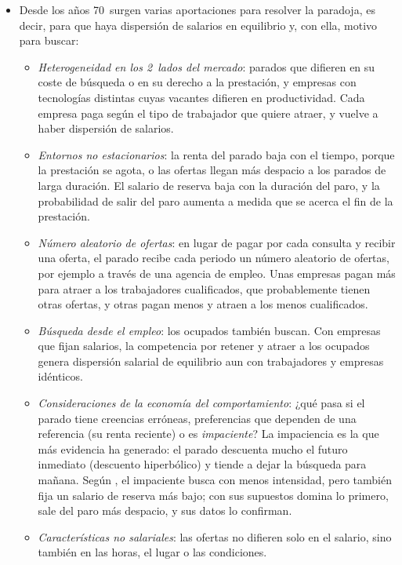 \documentclass[11pt]{article}
\begin{document}
\begin{itemize}
\item Desde los años 70~surgen varias aportaciones para resolver la paradoja, es decir, para que haya dispersión de salarios en equilibrio y, con ella, motivo para buscar:
  \begin{itemize}
  \item \emph{Heterogeneidad en los 2~lados del mercado}: parados que difieren en su coste de búsqueda o en su derecho a la prestación, y empresas con tecnologías distintas cuyas vacantes difieren en productividad. Cada empresa paga según el tipo de trabajador que quiere atraer, y vuelve a haber dispersión de salarios.
  \item \emph{Entornos no estacionarios}: la renta del parado baja con el tiempo, porque la prestación se agota, o las ofertas llegan más despacio a los parados de larga duración. El salario de reserva baja con la duración del paro, y la probabilidad de salir del paro aumenta a medida que se acerca el fin de la prestación\nocite{Mortensen1977Unemployment}.
  \item \emph{Número aleatorio de ofertas}: en lugar de pagar por cada consulta y recibir una oferta, el parado recibe cada periodo un número aleatorio de ofertas, por ejemplo a través de una agencia de empleo. Unas empresas pagan más para atraer a los trabajadores cualificados, que probablemente tienen otras ofertas, y otras pagan menos y atraen a los menos cualificados.
  \item \emph{Búsqueda desde el empleo}: los ocupados también buscan\nocite{Burdett1978Theory}. Con empresas que fijan salarios, la competencia por retener y atraer a los ocupados genera dispersión salarial de equilibrio aun con trabajadores y empresas idénticos\nocite{BurdettMortensen1998Wage}.
  \item \emph{Consideraciones de la economía del comportamiento}: ¿qué pasa si el parado tiene creencias erróneas, preferencias que dependen de una referencia (su renta reciente) o es \emph{impaciente}? La impaciencia es la que más evidencia ha generado: el parado descuenta mucho el futuro inmediato (descuento hiperbólico) y tiende a dejar la búsqueda para mañana. Según \textcite{DellaVignaPaserman2005Job}, el impaciente busca con menos intensidad, pero también fija un salario de reserva más bajo; con sus supuestos domina lo primero, sale del paro más despacio, y sus datos lo confirman.
  \item \emph{Características no salariales}\nocite{Blau1991Search}: las ofertas no difieren solo en el salario, sino también en las horas, el lugar o las condiciones.

\end{itemize}
\end{itemize}
\end{document}
